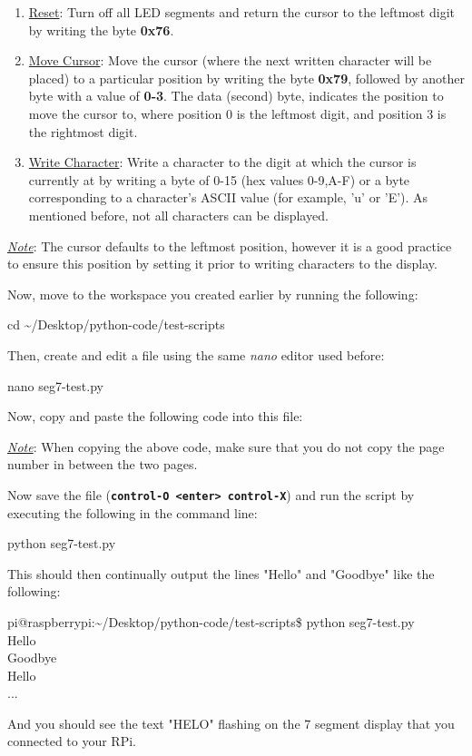 \documentclass{article}
\newcommand*{\myfont}{\fontfamily{pcr}\selectfont}
\newcommand{\codeb}[2]{
  \begin{tcolorbox}[width=\textwidth,colback={SpringGreen},title={#1},colbacktitle=DarkGreen,coltitle=SpringGreen]
    \myfont
    #2
  \end{tcolorbox}
} %
\newcommand{\outputb}[2]{
  \begin{tcolorbox}[width=\textwidth,colback={light-gray},title={#1},colbacktitle=gray,coltitle=light-gray]
    \myfont
    #2
  \end{tcolorbox}
} %
\newcommand{\note}[1]{\underline{\textit{Note}}: #1}
\begin{document}
  \begin{enumerate}
    \item \underline{Reset}: Turn off all LED segments and return the cursor to the leftmost digit by writing the byte \textbf{0x76}.
    \item \underline{Move Cursor}: Move the cursor (where the next written character will be placed) to a particular position by writing the byte \textbf{0x79}, followed by another byte with a value of \textbf{0-3}. The data (second) byte, indicates the position to move the cursor to, where position 0 is the leftmost digit, and position 3 is the rightmost digit.
    \item \underline{Write Character}: Write a character to the digit at which the cursor is currently at by writing a byte of 0-15 (hex values 0-9,A-F) or a byte corresponding to a character's ASCII value (for example, 'u' or 'E'). As mentioned before, not all characters can be displayed.
  \end{enumerate}

  \linebreak
  \newline
  \underline{\textit{Note}}: The cursor defaults to the leftmost position, however it is a good practice to ensure this position by setting it prior to writing characters to the display.
  \newline
  \noindent

  Now, move to the workspace you created earlier by running the following:
  \codeb{Navigate to your workspace}
  {
    cd \textasciitilde/Desktop/python-code/test-scripts
  }
  \newline
  \noindent
  Then, create and edit a file using the same \textit{nano} editor used before:
  \codeb{Create seg7 Python testing script file}
  {
    nano seg7-test.py
  }
  \newline
  \noindent
  Now, copy and paste the following code into this file:
  
  \note{When copying the above code, make sure that you do not copy the page number in between the two pages.}

  \newline
  \noindent
  Now save the file (\textbf{\texttt{control-O <enter> control-X}}) and run the script by executing the following in the command line:
  \codeb{Run the test script for seg7 sensor}{python seg7-test.py}
  This should then continually output the lines "Hello" and "Goodbye" like the following:
  \outputb{Test script output for seg7 sensor}
  {
    pi@raspberrypi:\textasciitilde/Desktop/python-code/test-scripts\$ python seg7-test.py        \\
    Hello                                   \\
    Goodbye                                   \\
    Hello                                   \\
    ...
  }
  And you should see the text "HELO" flashing on the 7 segment display that you connected to your RPi.
\end{document}
